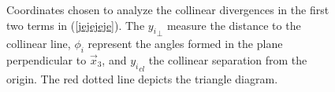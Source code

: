 \documentclass[%
 reprint,
 amsmath,amssymb,
 aps,
]{revtex4-1}
\begin{document}
\begin{figure}[ht!]
\caption{Coordinates chosen to analyze the collinear divergences in the first two terms in (\ref{jejejeje}). The ${y_i}_\perp$ measure the distance to the collinear line, ${\phi}_i$ represent the angles formed in the plane perpendicular to $\vec{x}_{3}$, and ${y_i}_{cl}$ the collinear separation from the origin. The red dotted line depicts the triangle diagram.}\label{frens}
\end{figure}
\end{document}
